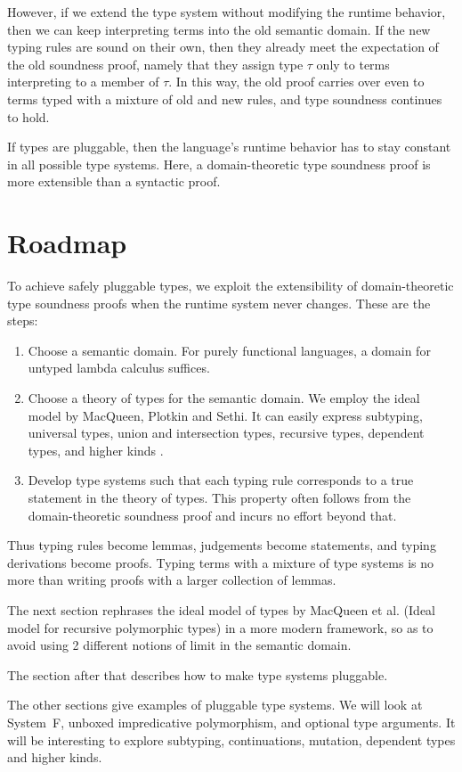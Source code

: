 \documentclass{amsart}
\theoremstyle{definition}
\def\thingsExpressibleInMpsModel{%
subtyping, universal types, union and intersection types,
recursive types, dependent types, and higher kinds%
}
\begin{document}
However, if we extend the type system without modifying the
runtime behavior, then we can keep interpreting terms into the
old semantic domain. If the new typing rules are sound on their
own, then they already meet the expectation of the old soundness
proof, namely that they assign type $\tau$ only to terms
interpreting to a member of $\tau$. In this way, the old proof
carries over even to terms typed with a mixture of old and new
rules, and type soundness continues to hold.

If types are pluggable, then the language's runtime behavior has
to stay constant in all possible type systems. Here, a
domain-theoretic type soundness proof is more extensible than a
syntactic proof.


\section{Roadmap}

To achieve safely pluggable types, we exploit the extensibility
of domain-theoretic type soundness proofs when the runtime system
never changes. These are the steps:
\begin{enumerate}
\item Choose a semantic domain. For purely functional languages,
a domain for untyped lambda calculus suffices.
\item Choose a theory of types for the semantic domain. We employ
the ideal model by MacQueen, Plotkin and Sethi. It can easily
express \thingsExpressibleInMpsModel.
\item Develop type systems such that each typing rule corresponds
to a true statement in the theory of types. This property often
follows from the domain-theoretic soundness proof and incurs no
effort beyond that.
\end{enumerate}
Thus typing rules become lemmas, judgements become statements,
and typing derivations become proofs. Typing terms with a mixture
of type systems is no more than writing proofs with a larger
collection of lemmas.

The next section rephrases the ideal model of types by MacQueen
et al. (Ideal model for recursive polymorphic types) in a more
modern framework, so as to avoid using 2 different notions of
limit in the semantic domain.

The section after that describes how to make type systems
pluggable.

The other sections give examples of pluggable type systems. We
will look at System~F, unboxed impredicative polymorphism, and
optional type arguments. It will be interesting to explore
subtyping, continuations, mutation, dependent types and higher
kinds.
\end{document}
